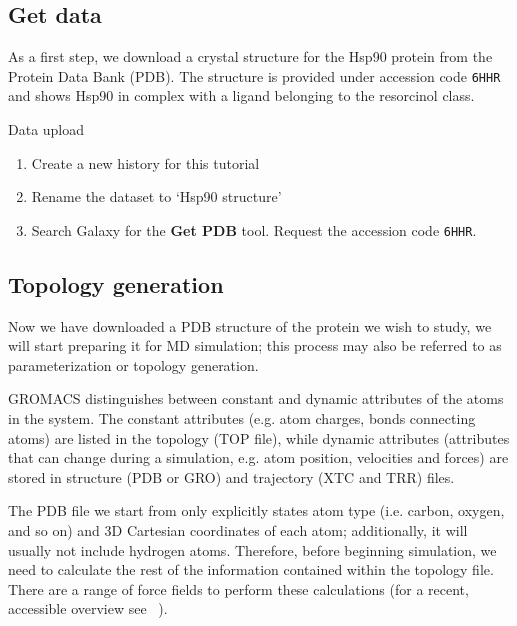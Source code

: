 \documentclass[twocolumn]{bmcart}%
\providecommand{\tightlist}{%
  \setlength{\itemsep}{0pt}\setlength{\parskip}{0pt}}
\begin{document}
\subsection*{Get data}\label{get-data}

As a first step, we download a crystal structure for the Hsp90 protein from the Protein Data Bank (PDB). The structure is provided under accession code \texttt{6HHR}~\cite{Schuetz2018} and shows Hsp90 in complex with a ligand belonging to the resorcinol class.

\begin{handson_box_colour}{Data upload}

\begin{enumerate}
\def\labelenumi{\arabic{enumi}.}
\tightlist
\item
  Create a new history for this tutorial

\item
  Rename the dataset to `Hsp90 structure'
\item
  Search Galaxy for the \textbf{Get PDB} tool. Request the accession code \texttt{6HHR}.
\end{enumerate}
\end{handson_box_colour}

\subsection*{Topology generation}\label{topology-generation}

Now we have downloaded a PDB structure of the protein we wish to study, we will start preparing it for MD simulation; this process may also be referred to as parameterization or topology generation.

GROMACS distinguishes between constant and dynamic attributes of the
atoms in the system. The constant attributes (e.g. atom charges, bonds
connecting atoms) are listed in the topology (TOP file), while dynamic
attributes (attributes that can change during a simulation, e.g. atom
position, velocities and forces) are stored in structure (PDB or GRO)
and trajectory (XTC and TRR) files.

The PDB file we start from only explicitly states atom type (i.e. carbon, oxygen, and so on) and
3D Cartesian coordinates of each atom; additionally, it will usually not include hydrogen atoms. Therefore, before beginning simulation, we need to calculate
the rest of the information contained within the topology file. There
are a range of force fields to perform these calculations (for a recent, accessible overview see ~\cite{Lemkul2020}).
\end{document}
